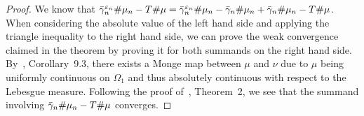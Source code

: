 \begin{proof}
	We know that $\push[\bar{\gamma}_n^{\varepsilon_n}]{\mu_n} - \push{\mu} = \push[\bar{\gamma}_n^{\varepsilon_n}]{\mu_n} - \push[\bar{\gamma}_n]{\mu_n} + \push[\bar{\gamma}_n]{\mu_n} - \push{\mu}$. When considering the absolute value of the left hand side and applying the triangle inequality to the right hand side, we can prove the weak convergence claimed in the theorem by proving it for both summands on the right hand side.	By~\cite{Vill2009}, Corollary~9.3, there exists a Monge map between $\mu$ and $\nu$ due to $\mu$ being uniformly continuous on $\Omega_1$ and thus absolutely continuous with respect to the Lebesgue measure. Following the proof of~\cite{Seg2018}, Theorem~2, we see that the summand involving $\push[\bar{\gamma}_n]{\mu_n} - \push[T]{\mu}$ converges.
	

\end{proof}
